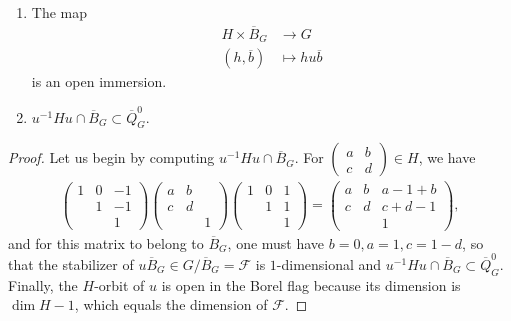 \documentclass[10pt,a4paper]{amsart}
\begin{document}
\begin{Lemma}
\label{46}
\begin{enumerate} 
\item The map 
\begin{align*}
H\times \overline{B}_G&\to G\\
(h,\overline{b})&\mapsto hu\overline{b}
\end{align*}
is an open immersion.
\item $u^{-1}Hu\cap \overline{B}_G\subset \overline{Q}^0_G$.
\end{enumerate}
\end{Lemma}

\begin{proof}
Let us begin by computing $u^{-1}Hu\cap \overline{B}_G$. For $\begin{pmatrix}
a&b\\
c&d
\end{pmatrix}\in H$, we have
\begin{align*}
\begin{pmatrix}
1&0&-1\\
&1&-1\\
&&1
\end{pmatrix} \begin{pmatrix}
a&b&\\
c&d&\\
&&1
\end{pmatrix} \begin{pmatrix}
1&0&1\\
&1&1\\
&&1
\end{pmatrix}=\begin{pmatrix}
a&b&a-1+b\\c&d&c+d-1\\
&&1
\end{pmatrix},
\end{align*}
and for this matrix to belong to $\overline{B}_G$, one must have $b=0, a=1, c=1-d$, so that the stabilizer of $u\overline{B}_G\in G/\overline{B}_G=\mathcal{F}$ is $1$-dimensional and $u^{-1}Hu\cap \overline{B}_G\subset \overline{Q}^0_G$.
Finally, the $H$-orbit of $u$ is open in the Borel flag because its dimension is $\dim H-1$, which equals the dimension of $\mathcal{F}$.

\end{proof}
\end{document}
